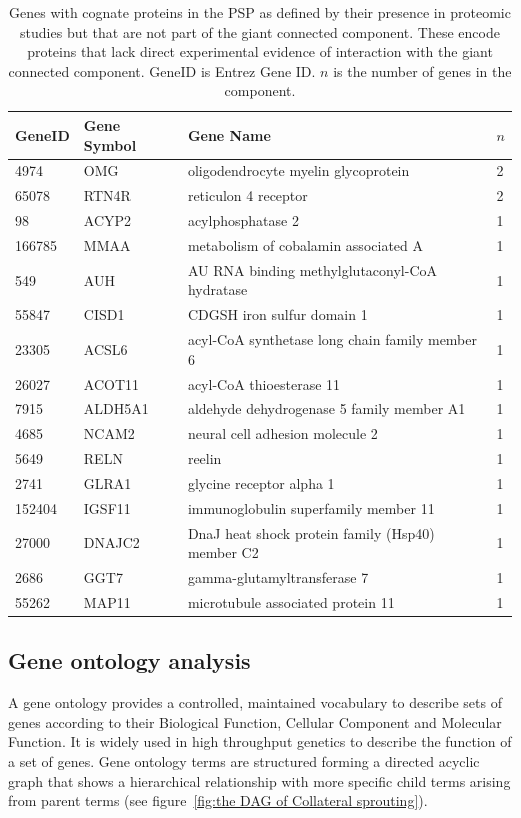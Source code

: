 \begin{table}[ht]
 \setlength{\extrarowheight}{2pt}
\centering
\begin{tabular}{llll}
\toprule
 
GeneID & Gene Symbol & Gene Name & $n$ \\ 
\midrule
 4974 & OMG & oligodendrocyte myelin glycoprotein & 2 \\ 
  65078 & RTN4R & reticulon 4 receptor & 2 \\ 
 98 & ACYP2 & acylphosphatase 2 & 1 \\ 
  166785 & MMAA & metabolism of cobalamin associated A & 1 \\ 
  549 & AUH & AU RNA binding methylglutaconyl-CoA hydratase & 1 \\ 
  55847 & CISD1 & CDGSH iron sulfur domain 1 & 1 \\ 
  23305 & ACSL6 & acyl-CoA synthetase long chain family member 6 & 1 \\ 
  26027 & ACOT11 & acyl-CoA thioesterase 11 & 1 \\ 
  7915 & ALDH5A1 & aldehyde dehydrogenase 5 family member A1 & 1 \\ 
  4685 & NCAM2 & neural cell adhesion molecule 2 & 1 \\ 
 
  5649 & RELN & reelin & 1 \\ 
  2741 & GLRA1 & glycine receptor alpha 1 & 1 \\ 
  152404 & IGSF11 & immunoglobulin superfamily member 11 & 1 \\ 
 
  27000 & DNAJC2 & DnaJ heat shock protein family (Hsp40) member C2 & 1 \\ 
  2686 & GGT7 & gamma-glutamyltransferase 7 & 1 \\ 
  55262 & MAP11 & microtubule associated protein 11 & 1 \\ 
   \bottomrule
\end{tabular}
\caption[Genes not in largest connected component]{Genes with cognate proteins in the PSP as defined by their presence in proteomic studies but that are not part of the giant connected component. These encode proteins that lack direct experimental evidence of interaction with the giant connected component. GeneID is Entrez Gene ID. $n$ is the number of genes in the component.} 
\label{table:notinLCC}
\end{table}

\subsection{Gene ontology analysis}
\label{sec: gene ontology analysis}
A gene ontology provides a controlled, maintained vocabulary to describe sets of genes according to their Biological Function, Cellular Component and Molecular Function. It is widely used in high throughput genetics to describe the function of a set of genes\cite{ashburner2000gene}. Gene ontology terms are structured forming a directed acyclic graph that shows a hierarchical relationship with more specific child terms arising from parent terms (see figure~\ref{fig:the DAG of Collateral sprouting}).

